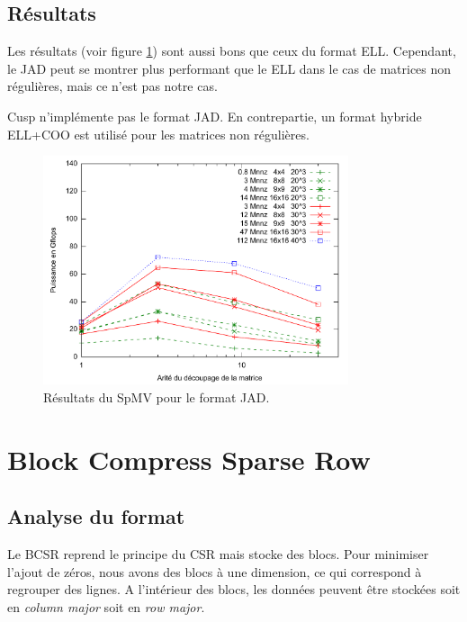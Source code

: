 \documentclass[a4paper,11pt]{report}
\begin{document}
  \subsection{Résultats}  
   Les résultats (voir figure \ref{res_jad}) sont aussi bons que ceux du format ELL. Cependant, le
   JAD peut se montrer plus performant que le ELL dans le cas de
   matrices non régulières, mais ce n'est pas notre cas.
   
   Cusp n'implémente pas le format JAD. En contrepartie, un format
   hybride ELL+COO est utilisé pour les matrices non régulières.

   \begin{figure}[h!]\begin{center}
     \includegraphics[width=0.8\textwidth]{resultats/JAD.pdf}
     \caption{Résultats du SpMV pour le format JAD.}
     \label{res_jad}
   \end{center}\end{figure}


 \section[BCSR : Block Compress Sparse Row]{Block Compress Sparse Row}
  \subsection{Analyse du format}
   
   Le BCSR reprend le principe du CSR mais stocke des blocs. Pour
   minimiser l'ajout de zéros, nous avons des blocs à une dimension, ce
   qui correspond à regrouper des lignes. A l'intérieur des blocs, les
   données peuvent être stockées soit en \textit{column major} soit en \textit{row major}.
\end{document}
